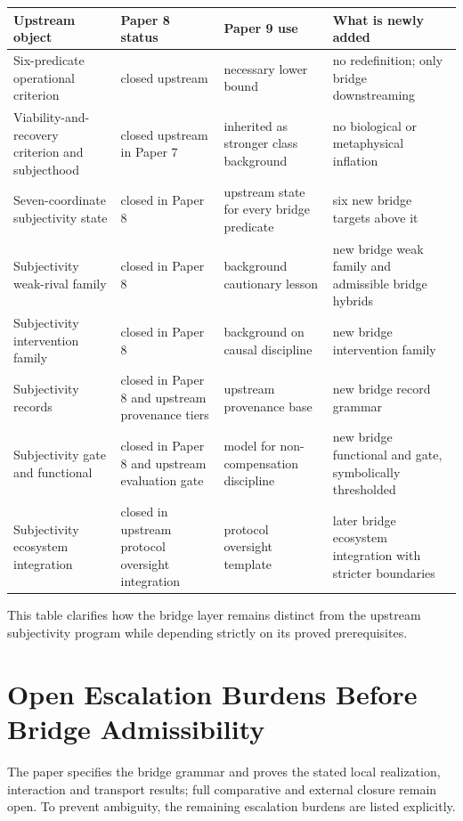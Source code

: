 \documentclass[11pt,a4paper]{article}
\theoremstyle{definition}
\begin{document}
\begin{center}
\small
\begin{tabularx}{\linewidth}{@{}>{\raggedright\arraybackslash}p{}>{\raggedright\arraybackslash}p{}>{\raggedright\arraybackslash}p{}>{\raggedright\arraybackslash}p{}@{}}
\toprule
Upstream object & Paper 8 status & Paper 9 use & What is newly added \\
\midrule
Six-predicate operational criterion & closed upstream & necessary lower bound & no redefinition; only bridge downstreaming \\
Viability-and-recovery criterion and subjecthood & closed upstream in Paper 7 & inherited as stronger class background & no biological or metaphysical inflation \\
Seven-coordinate subjectivity state & closed in Paper 8 & upstream state for every bridge predicate & six new bridge targets above it \\
Subjectivity weak-rival family & closed in Paper 8 & background cautionary lesson & new bridge weak family and admissible bridge hybrids \\
Subjectivity intervention family & closed in Paper 8 & background on causal discipline & new bridge intervention family \\
Subjectivity records & closed in Paper 8 and upstream provenance tiers & upstream provenance base & new bridge record grammar \\
Subjectivity gate and functional & closed in Paper 8 and upstream evaluation gate & model for non-compensation discipline & new bridge functional and gate, symbolically thresholded \\
Subjectivity ecosystem integration & closed in upstream protocol oversight integration & protocol oversight template & later bridge ecosystem integration with stricter boundaries \\
\bottomrule
\end{tabularx}
\end{center}

This table clarifies how the bridge layer remains distinct from the upstream subjectivity program while depending strictly on its proved prerequisites.

\section{Open Escalation Burdens Before Bridge Admissibility}
The paper specifies the bridge grammar and proves the stated local realization, interaction and transport results; full comparative and external closure remain open. To prevent ambiguity, the remaining escalation burdens are listed explicitly.
\end{document}
